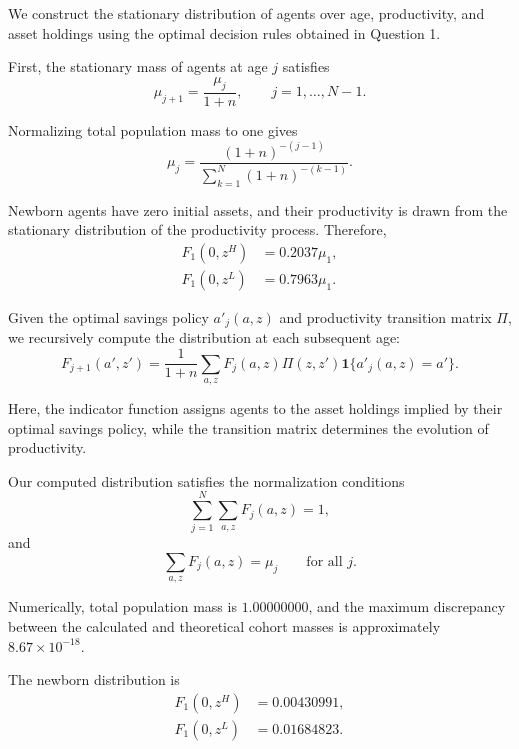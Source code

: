 \documentclass{article}
\begin{document}
We construct the stationary distribution of agents over age,
productivity, and asset holdings using the optimal decision
rules obtained in Question 1.

First, the stationary mass of agents at age $j$ satisfies
\begin{equation*}
    \mu_{j+1}=\frac{\mu_j}{1+n},
    \qquad j=1,\ldots,N-1.
\end{equation*}

Normalizing total population mass to one gives
\begin{equation*}
    \mu_j =
    \frac{(1+n)^{-(j-1)}}
    {\displaystyle\sum_{k=1}^{N}(1+n)^{-(k-1)}}.
\end{equation*}

Newborn agents have zero initial assets, and their
productivity is drawn from the stationary distribution
of the productivity process. Therefore,
\begin{align*}
    F_1(0,z^H) &= 0.2037\mu_1,\\
    F_1(0,z^L) &= 0.7963\mu_1.
\end{align*}

Given the optimal savings policy $a'_j(a,z)$ and
productivity transition matrix $\Pi$, we recursively
compute the distribution at each subsequent age:
\begin{equation*}
    F_{j+1}(a',z')
    =
    \frac{1}{1+n}
    \sum_{a,z}
    F_j(a,z)\Pi(z,z')
    \mathbf{1}\{a'_j(a,z)=a'\}.
\end{equation*}

Here, the indicator function assigns agents to the
asset holdings implied by their optimal savings policy,
while the transition matrix determines the evolution
of productivity.

Our computed distribution satisfies the normalization
conditions
\begin{equation*}
    \sum_{j=1}^{N}\sum_{a,z}F_j(a,z)=1,
\end{equation*}
and
\begin{equation*}
    \sum_{a,z}F_j(a,z)=\mu_j
    \qquad \text{for all }j.
\end{equation*}

Numerically, total population mass is $1.00000000$,
and the maximum discrepancy between the calculated
and theoretical cohort masses is approximately
$8.67\times 10^{-18}$.

The newborn distribution is
\begin{align*}
    F_1(0,z^H)&=0.00430991,\\
    F_1(0,z^L)&=0.01684823.
\end{align*}
\end{document}
